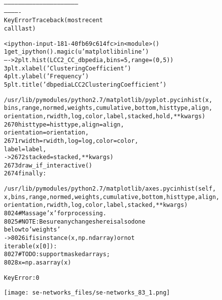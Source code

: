 \documentclass[letterpaper,10pt,english]{/usr/local/lib/python2.7/dist-packages/sphinx/texinputs/sphinxhowto}
\newenvironment{InvisibleVerbatim}
        {\begin{mdframed}[leftmargin=0.1\linewidth,innerleftmargin=3pt,innerrightmargin=3pt, userdefinedwidth=1\linewidth, linewidth=0pt, linecolor=white, usetwoside=false]}
        {\end{mdframed}}
\begin{document}
                
            \begin{alltt}

        --------------------------------------------------------------
-------------
    KeyError                                  Traceback (most recent
call last)



        <ipython-input-181-40fb69c614fc> in <module>()
          1 get\_ipython().magic(u'matplotlib inline')
    ----> 2 plt.hist(LCC2\_CC\_dbpedia, bins = 5, range = (0, 5))
          3 plt.xlabel('Clustering Coefficient')
          4 plt.ylabel('Frequency')
          5 plt.title('dbpedia LCC2 Clustering Coefficient')




        /usr/lib/pymodules/python2.7/matplotlib/pyplot.pyc in hist(x,
bins, range, normed, weights, cumulative, bottom, histtype, align,
orientation, rwidth, log, color, label, stacked, hold, **kwargs)
       2670                       histtype=histtype, align=align,
orientation=orientation,
       2671                       rwidth=rwidth, log=log, color=color,
label=label,
    -> 2672                       stacked=stacked, **kwargs)
       2673         draw\_if\_interactive()
       2674     finally:




        /usr/lib/pymodules/python2.7/matplotlib/axes.pyc in hist(self,
x, bins, range, normed, weights, cumulative, bottom, histtype, align,
orientation, rwidth, log, color, label, stacked, **kwargs)
       8024         \# Massage 'x' for processing.
       8025         \# NOTE: Be sure any changes here is also done
below to 'weights'
    -> 8026         if isinstance(x, np.ndarray) or not
iterable(x[0]):
       8027             \# TODO: support masked arrays;
       8028             x = np.asarray(x)




        KeyError: 0

\end{alltt}
        
            
                \begin{InvisibleVerbatim}
                \vspace{-0.5\baselineskip}
    \begin{center}
    \texttt{[image: se-networks\_files/se-networks\_83\_1.png]}
    \par
    \end{center}
    
            \end{InvisibleVerbatim}
            
\end{document}
